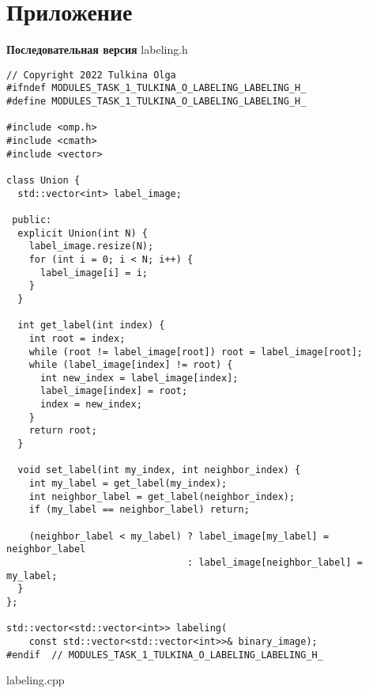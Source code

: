 \documentclass[12pt]{article}
\begin{document}
\section*{Приложение}
\textbf{Последовательная версия}
\newline
\newline labeling.h
\begin{lstlisting}
// Copyright 2022 Tulkina Olga
#ifndef MODULES_TASK_1_TULKINA_O_LABELING_LABELING_H_
#define MODULES_TASK_1_TULKINA_O_LABELING_LABELING_H_

#include <omp.h>
#include <cmath>
#include <vector>

class Union {
  std::vector<int> label_image;

 public:
  explicit Union(int N) {
    label_image.resize(N);
    for (int i = 0; i < N; i++) {
      label_image[i] = i;
    }
  }

  int get_label(int index) {
    int root = index;
    while (root != label_image[root]) root = label_image[root];
    while (label_image[index] != root) {
      int new_index = label_image[index];
      label_image[index] = root;
      index = new_index;
    }
    return root;
  }

  void set_label(int my_index, int neighbor_index) {
    int my_label = get_label(my_index);
    int neighbor_label = get_label(neighbor_index);
    if (my_label == neighbor_label) return;

    (neighbor_label < my_label) ? label_image[my_label] = neighbor_label
                                : label_image[neighbor_label] = my_label;
  }
};

std::vector<std::vector<int>> labeling(
    const std::vector<std::vector<int>>& binary_image);
#endif  // MODULES_TASK_1_TULKINA_O_LABELING_LABELING_H_
\end{lstlisting}
labeling.cpp
\end{document}
